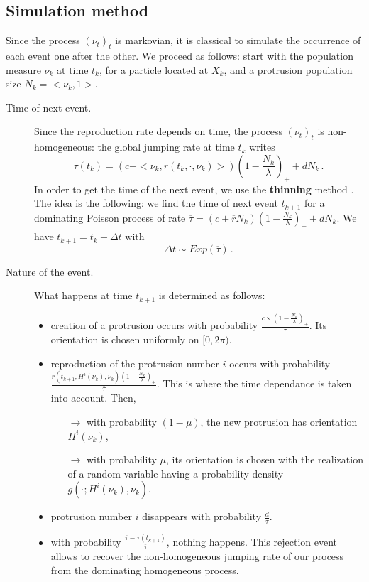 \documentclass[a4paper,11pt]{article}
\begin{document}
\subsection{Simulation method}
Since the process $(\nu_t)_t$ is markovian, it is classical to simulate the occurrence of each event one after the other. We proceed as follows: start with the population measure $\nu_k$ at time $t_k$, for a particle located at $X_{k}$, and a protrusion population size $N_k=<\nu_k,1>$.
\begin{description}
\item[Time of next event.] Since the reproduction rate depends on time, the process $(\nu_t)_t$ is non-homogeneous: the global jumping rate at time $t_k$ writes $$\tau(t_k) =  (c + <\nu_k,r(t_k,\cdot,\nu_k)>)(1-\frac{N_k}{\lambda})_+ + dN_k\,.$$
 In order to get the time of the next event, we use the \textbf{thinning} method \citep{lewis1979simulation}. The idea is the following: we find the time of next event $t_{k+1}$ for a dominating Poisson process of rate $\overline{\tau} = (c + \overline{r}N_k)(1-\frac{N_k}{\lambda})_+ + dN_k$. We have $t_{k+1} = t_k + \Delta t$ with 
\begin{displaymath}
\Delta t \sim Exp(\overline{\tau})\,.
\end{displaymath}
\item[Nature of the event.] What happens at time $t_{k+1}$ is determined as follows:
\begin{itemize}
\item creation of a protrusion occurs with probability $\frac{c\times (1-\frac{N_k}{\lambda})_+}{\overline{\tau}}$. Its orientation is chosen uniformly on $[0,2\pi)$. 
\item reproduction of the protrusion number $i$ occurs with probability $\frac{r(t_{k+1},H^i(\nu_k),\nu_k)(1-\frac{N_k}{\lambda})_+}{\overline{\tau}}$. This is where the time dependance is taken into account. Then,
\begin{itemize}
\item[$\rightarrow$] with probability $(1-\mu)$, the new protrusion has orientation $H^i(\nu_k)$,
\item[$\rightarrow$] with probability $\mu$, its orientation is chosen with the realization of a random variable having a probability density $g(\cdot; H^i(\nu_k),\nu_k)$.
\end{itemize}
\item protrusion number $i$ disappears with probability $\frac{d}{\overline{\tau}}$.
\item with probability $\frac{\overline{\tau} - \tau(t_{k+1})}{\overline{\tau}}$, nothing happens. This rejection event allows to recover the non-homogeneous jumping rate of our process from the dominating homogeneous process. 

\end{itemize}
\end{description}
\end{document}
